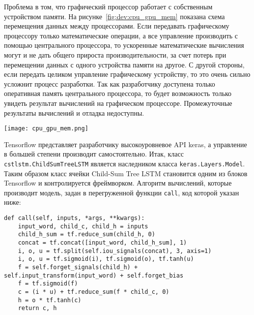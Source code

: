 Проблема в том, что графический процессор работает с собственным устройством памяти. На рисунке~\ref{fig:dev:cpu_gpu_mem} показана схема перемещения данных между процессорами. Если передавать графическому процессору только математические операции, а все управление производить с помощью центрального процессора, то ускоренные математические вычисления могут и не дать общего прироста производительности, за счет потерь при перемещении данных с одного устройства памяти на другое. С другой стороны, если передать целиком управление графическому устройству, то это очень сильно усложнит процесс разработки. Так как разработчику доступена только оперативная память центрального процессора, то будет возможность только увидеть результат вычислений на графическом процессоре. Промежуточные результаты вычислений и отладка недоступны.

\begin{center}
  \texttt{[image: cpu\_gpu\_mem.png]}
  \label{fig:dev:cpu_gpu_mem}
\end{center}

Tensorflow представляет разработчику высокоуровневое API keras, а управление в большей степени производит самостоятельно. Итак, класс \texttt{cst\-lstm.ChildSumTreeLSTM} является наследником класса \texttt{keras.Layers.Model}. Таким образом класс ячейки Child-Sum Tree LSTM становится одним из блоков Tensorflow и контролируется фреймворком. Алгоритм вычислений, которые производит модель, задан в перегруженной функции \texttt{call}, код которой указан ниже:
\medskip
\begin{lstlisting}[style=Python]
  def call(self, inputs, *args, **kwargs):
    input_word, child_c, child_h = inputs
    child_h_sum = tf.reduce_sum(child_h, 0)
    concat = tf.concat([input_word, child_h_sum], 1)
    i, o, u = tf.split(self.iou_signals(concat), 3, axis=1)
    i, o, u = tf.sigmoid(i), tf.sigmoid(o), tf.tanh(u)
    f = self.forget_signals(child_h) + self.input_transform(input_word) + self.forget_bias
    f = tf.sigmoid(f)
    c = (i * u) + tf.reduce_sum(f * child_c, 0)
    h = o * tf.tanh(c)
    return c, h
\end{lstlisting}
\medskip

